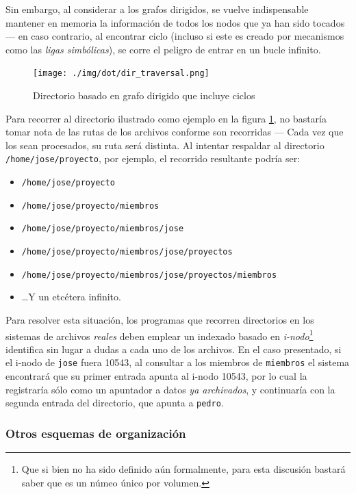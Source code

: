\documentclass[11pt,fleqn]{book} %
\begin{document}
Sin embargo, al considerar a los grafos dirigidos, se vuelve
indispensable mantener en memoria la información de todos los nodos
que ya han sido tocados — en caso contrario, al encontrar ciclo (incluso
si este es creado por mecanismos como las \emph{ligas simbólicas}),
se corre el peligro de entrar en un bucle infinito.

\begin{figure}[htb]
\centering
\texttt{[image: ./img/dot/dir\_traversal.png]}
\caption{\label{DIR_arbol_para_recorrer}Directorio basado en grafo dirigido que incluye ciclos}
\end{figure}

Para recorrer al directorio ilustrado como ejemplo en la figura
\ref{DIR_arbol_para_recorrer}, no bastaría tomar nota de las rutas de
los archivos conforme son recorridas — Cada vez que los sean
procesados, su ruta será distinta.  Al intentar respaldar al
directorio \texttt{/home/jose/proyecto}, por ejemplo, el recorrido resultante
podría ser:

\begin{itemize}
\item \texttt{/home/jose/proyecto}
\item \texttt{/home/jose/proyecto/miembros}
\item \texttt{/home/jose/proyecto/miembros/jose}
\item \texttt{/home/jose/proyecto/miembros/jose/proyectos}
\item \texttt{/home/jose/proyecto/miembros/jose/proyectos/miembros}
\item \ldots{}Y un etcétera infinito.
\end{itemize}

Para resolver esta situación, los programas que recorren directorios
en los sistemas de archivos \emph{reales} deben emplear un indexado basado
en \emph{i-nodo}\footnote{Que si bien no ha sido definido aún formalmente, para
esta discusión bastará saber que es un númeo único por volumen. }
identifica sin lugar a dudas a cada uno de los archivos. En el caso
presentado, si el i-nodo de \texttt{jose} fuera 10543, al consultar a los
miembros de \texttt{miembros} el sistema encontrará que su primer entrada
apunta al i-nodo 10543, por lo cual la registraría sólo como un
apuntador a datos \emph{ya archivados}, y continuaría con la segunda
entrada del directorio, que apunta a \texttt{pedro}.
\subsubsection{Otros esquemas de organización}
\label{sec-6-3-2-2}
\end{document}
